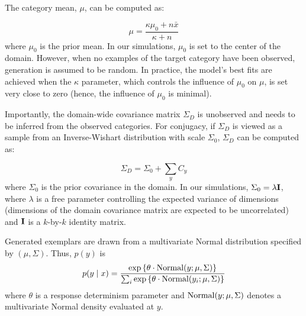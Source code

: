 \documentclass[12pt]{article}
\begin{document}
The category mean, $\mu$, can be computed as:

\begin{equation} \mu = \dfrac {\kappa\mu_{0} + n \bar{x}} {\kappa + n}
    \label{eq:category_mus_jk13}
\end{equation}
% 
where $\mu_{0}$ is the prior mean. In our simulations, $\mu_{0}$ is set to the
center of the domain. However, when no examples of the target category have been
observed, generation is assumed to be random. In practice, the model's best fits
are achieved when the $\kappa$ parameter, which controls the influence of
$\mu_0$ on $\mu$, is set very close to zero (hence, the influence of $\mu_0$ is
minimal).

Importantly, the domain-wide covariance matrix $\Sigma_D$ is unobserved and
needs to be inferred from the observed categories. For conjugacy, if $\Sigma_D$
is viewed as a sample from an Inverse-Wishart distribution with scale
$\Sigma_0$, $\Sigma_D$ can be computed as:

 \begin{equation} \Sigma_D = \Sigma_0 + \sum_y{C_y}
    \label{eq:category_sigmas}
\end{equation}
% 
where $\Sigma_0$ is the prior covariance in the domain. In our simulations,
$\Sigma_0 = \lambda {\bf I}$, where $\lambda$ is a free parameter controlling
the expected variance of dimensions (dimensions of the domain covariance matrix
are expected to be uncorrelated) and ${\bf I}$ is a $k$-by-$k$ identity matrix.

Generated exemplars are drawn from a multivariate Normal distribution specified
by $(\mu, \Sigma)$. Thus, $p(y)$ is
\begin{equation} p(y \mid x) = \dfrac {\exp \left \{ \theta \cdot {\rm
Normal}(y; \mu, \Sigma) \right \} } {\sum_i \exp \left \{ \theta \cdot {\rm
Normal}(y_i; \mu, \Sigma) \right \} }
\end{equation}
% 
where $\theta$ is a response determinism parameter and ${\rm Normal}(y; \mu,
\Sigma)$ denotes a multivariate Normal density evaluated at $y$.
\end{document}

